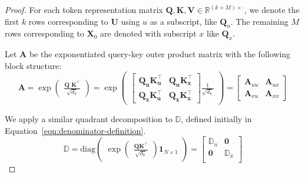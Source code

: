 \documentclass{article} %
\begin{document}
\begin{proof}
    For each token representation matrix $\mathbf{Q, K, V} \in \mathbb R^{(k+M) \times \cdot}$, we denote the first $k$ rows corresponding to $\mathbf U$ using $u$ as a subscript, like $\mathbf Q_u$. The remaining $M$ rows corresponding to $\mathbf X_0$ are denoted with subscript $x$ like $\mathbf Q_x$. 
    
    Let $\mathbf A$ be the exponentiated query-key outer product matrix with the following block structure: 
    \begin{equation}
        \label{eqn:def-A}
        \mathbf A = \exp \begin{pmatrix}
            \frac{
                \textbf{Q K}^\top
            }{
                \sqrt{d_k}
            }
        \end{pmatrix}
        = \exp \begin{pmatrix} 
            \begin{bmatrix}
                \mathbf{Q_u K_u^\top} & \mathbf{Q_u K_x^\top} \\
                \mathbf{Q_x K_u^\top} & \mathbf{Q_x K_x^\top}
            \end{bmatrix}
            \frac{1}{\sqrt{d_k}}
        \end{pmatrix}
         = \begin{bmatrix}
             \mathbf A_{uu} & \mathbf A_{ux} \\ 
             \mathbf A_{xu} & \mathbf A_{xx} 
         \end{bmatrix}
    \end{equation}

    We apply a similar quadrant decomposition to $\mathbb D$, defined initially in Equation~\ref{eqn:denominator-definition}.
    \begin{equation}
        \label{eqn:denom-decomp}
        \mathbb D = \text{diag}\begin{pmatrix} \exp\begin{pmatrix} \frac{\mathbf{QK}^\top}{\sqrt{d_k}} \end{pmatrix} \mathbf 1_{N\times 1} \end{pmatrix}
        = \begin{bmatrix}
            \mathbb D_u & \mathbf 0 \\ 
            \mathbf 0 & \mathbb D_x \\ 
        \end{bmatrix}
    \end{equation}


\end{proof}
\end{document}
